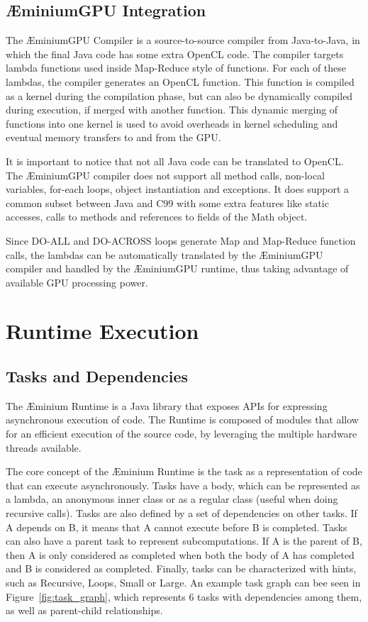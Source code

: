 \documentclass[smallextended]{svjour3}
\begin{document}
\subsection{ÆminiumGPU Integration}

The ÆminiumGPU Compiler is a source-to-source compiler from Java-to-Java, in which the final Java code has some extra OpenCL code. The compiler targets lambda functions used inside Map-Reduce style of functions. For each of these lambdas, the compiler generates an OpenCL function. This function is compiled as a kernel during the compilation phase, but can also be dynamically compiled during execution, if merged with another function. This dynamic merging of functions into one kernel is used to avoid overheads in kernel scheduling and eventual memory transfers to and from the GPU.

It is important to notice that not all Java code can be translated to OpenCL. The ÆminiumGPU compiler does not support all method calls, non-local variables, for-each loops, object instantiation and exceptions. It does support a common subset between Java and C99 with some extra features like static accesses, calls to methods and references to fields of the Math object. 

Since DO-ALL and DO-ACROSS loops generate Map and Map-Reduce function calls, the lambdas can be automatically translated by the ÆminiumGPU compiler and handled by the ÆminiumGPU runtime, thus taking advantage of available GPU processing power.

\section{Runtime Execution}
\label{sec:runtime}

\subsection{Tasks and Dependencies}

The Æminium Runtime is a Java library that exposes APIs for expressing asynchronous execution of code. The Runtime is composed of modules that allow for an efficient execution of the source code, by leveraging the multiple hardware threads available.

The core concept of the Æminium Runtime is the task as a representation of code that can execute asynchronously. Tasks have a body, which can be represented as a lambda, an anonymous inner class or as a regular class (useful when doing recursive calls). Tasks are also defined by a set of dependencies on other tasks. If A depends on B, it means that A cannot execute before B is completed. Tasks can also have a parent task to represent subcomputations. If A is the parent of B, then A is only considered as completed when both the body of A has completed and B is considered as completed. Finally, tasks can be characterized with hints, such as Recursive, Loops, Small or Large. An example task graph can bee seen in Figure~\ref{fig:task_graph}, which represents 6 tasks with dependencies among them, as well as parent-child relationships.
\end{document}
